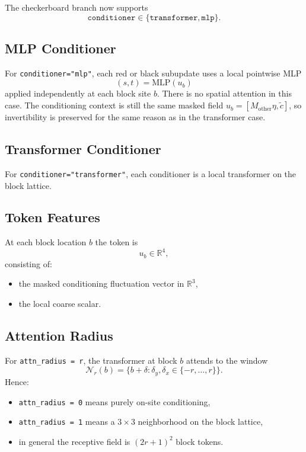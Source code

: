 \documentclass[11pt]{article}
\begin{document}
The checkerboard branch now supports
\[
\texttt{conditioner}\in\{\texttt{transformer},\texttt{mlp}\}.
\]

\subsection{MLP Conditioner}

For \texttt{conditioner="mlp"}, each red or black subupdate uses a local
pointwise MLP
\[
(s,t)=\mathrm{MLP}(u_b)
\]
applied independently at each block site $b$. There is no spatial attention in
this case. The conditioning context is still the same masked field
$u_b=[M_{\mathrm{other}}\eta,\tilde c]$, so invertibility is preserved for the
same reason as in the transformer case.

\subsection{Transformer Conditioner}

For \texttt{conditioner="transformer"}, each conditioner is a local transformer
on the block lattice.

\subsection{Token Features}

At each block location $b$ the token is
\[
u_b \in \mathbb{R}^4,
\]
consisting of:
\begin{itemize}
\item the masked conditioning fluctuation vector in $\mathbb{R}^3$,
\item the local coarse scalar.
\end{itemize}

\subsection{Attention Radius}

For \texttt{attn\_radius = r}, the transformer at block $b$ attends to the
window
\[
\mathcal N_r(b)=\{b+\delta:\delta_y,\delta_x\in\{-r,\dots,r\}\}.
\]
Hence:
\begin{itemize}
\item \texttt{attn\_radius = 0} means purely on-site conditioning,
\item \texttt{attn\_radius = 1} means a $3\times 3$ neighborhood on the block
lattice,
\item in general the receptive field is $(2r+1)^2$ block tokens.
\end{itemize}
\end{document}
